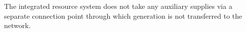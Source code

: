 The integrated resource system does not take any auxiliary supplies via a separate connection point through which generation is not transferred to the network.